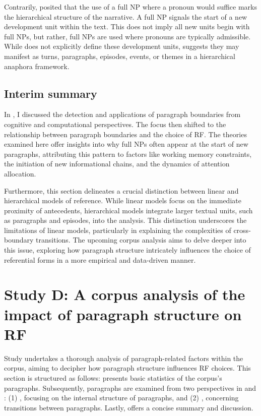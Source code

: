 Contrarily, \citet{fox1987anaphora} posited that the use of a full NP where a pronoun would suffice marks the hierarchical structure of the narrative. A full NP signals the start of a new development unit within the text. This does not imply all new units begin with full NPs, but rather, full NPs are used where pronouns are typically admissible. While \citet{fox1987anaphora} does not explicitly define these development units, \citet{Huang2000} suggests they may manifest as turns, paragraphs, episodes, events, or themes in a hierarchical anaphora framework.

\subsection{Interim summary}
In , I discussed the detection and applications of paragraph boundaries from cognitive and computational perspectives. The focus then shifted to the relationship between paragraph boundaries and the choice of RF.
The theories examined here offer insights into why full NPs often appear at the start of new paragraphs, attributing this pattern to factors like working memory constraints, the initiation of new informational chains, and the dynamics of attention allocation. 

Furthermore, this section delineates a crucial distinction between linear and hierarchical models of reference. While linear models focus on the immediate proximity of antecedents, hierarchical models integrate larger textual units, such as paragraphs and episodes, into the analysis. This distinction underscores the limitations of linear models, particularly in explaining the complexities of cross-boundary transitions. The upcoming corpus analysis aims to delve deeper into this issue, exploring how paragraph structure intricately influences the choice of referential forms in a more empirical and data-driven manner.

\section{Study D: A corpus analysis of the impact of paragraph structure on RF}\label{sec:corpuspar}

Study \studD undertakes a thorough analysis of paragraph-related factors within the \wsj corpus, aiming to decipher how paragraph structure influences RF choices. This section is structured as follows:  presents basic statistics of the \wsj corpus's paragraphs. Subsequently, paragraphs are examined from two perspectives in  and : (1) , focusing on the internal structure of paragraphs, and (2) , concerning transitions between paragraphs. Lastly,  offers a concise summary and discussion.


